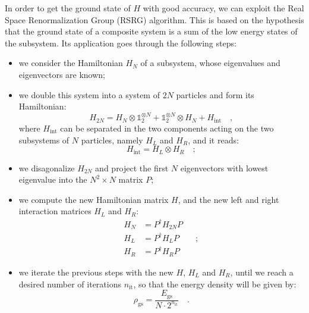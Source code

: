 \documentclass[pra, onecolumn, notitlepage, floats, 11pt]{revtex4-1}
\begin{document}
In order to get the ground state of \( H \) with good accuracy, we can exploit the Real Space Renormalization Group (RSRG) algorithm. This is based on the hypothesis that the ground state of a composite system is a sum of the low energy states of the subsystem. Its application goes through the following steps:
\begin{itemize}
    \setlength\itemsep{-3pt}
    \item we consider the Hamiltonian \( H_{N} \) of a subsystem, whose eigenvalues and eigenvectors are known;
    \item we double this system into a system of \( 2N \) particles and form its Hamiltonian:
    \begin{equation}
        H_{2N}
        =
        H_{N} \otimes \mathbb{1}^{\otimes N}_{2} + \mathbb{1}^{\otimes N}_{2} \otimes H_{N} + H_{\mathrm{int}}
        \quad ,
        \label{eq:10_T_2}
    \end{equation}
    where \( H_{\mathrm{int}} \) can be separated in the two components acting on the two subsystems of \( N \) particles, namely \( H_{L} \) and \( H_{R} \), and it reads:
    \begin{equation}
        H_{\mathrm{int}}
        =
        H_{L} \otimes H_{R}
        \quad ;
        \label{eq:10_T_3}
    \end{equation}
    \item we disagonalize \( H_{2N} \) and project the first \( N \) eigenvectors with lowest eigenvalue into the \( N^{2} \times N \) matrix \( P \);
    \item we compute the new Hamiltonian matrix \( H \), and the new left and right interaction matrices \( H_{L} \) and \( H_{R} \):
    \begin{subequations}
        \begin{align}
            H_{N} &= P^{\dag} H_{2N} P                  \\
            H_{L} &= P^{\dag} H_{L}  P  \quad\quad ;    \\
            H_{R} &= P^{\dag} H_{R}  P
        \end{align}
        \label{eq:10_T_4}
    \end{subequations}
    \item we iterate the previous steps with the new \( H \), \( H_{L} \) and \( H_{R} \), until we reach a desired number of iterations \( n_{\mathrm{it}} \), so that the energy density will be given by:
    \begin{equation}
        \rho_{\mathrm{gs}}
        =
        \frac{E_{\mathrm{gs}}}{N \cdot 2^{n_{\mathrm{it}}}}
        \quad .
        \label{eq:10_T_5}
    \end{equation}
\end{itemize}
\end{document}
